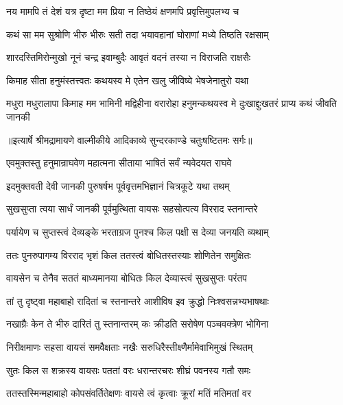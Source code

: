 \twolineshloka
{नय मामपि तं देशं यत्र दृष्टा मम प्रिया}
{न तिष्ठेयं क्षणमपि प्रवृत्तिमुपलभ्य च} %

\twolineshloka
{कथं सा मम सुश्रोणि भीरु भीरुः सती तदा}
{भयावहानां घोराणां मध्ये तिष्ठति रक्षसाम्} %

\twolineshloka
{शारदस्तिमिरोन्मुखो नूनं चन्द्र इवाम्बुदैः}
{आवृतं वदनं तस्या न विराजति राक्षसैः} %

\twolineshloka
{किमाह सीता हनुमंस्तत्त्वतः कथयस्व मे}
{एतेन खलु जीविष्ये भेषजेनातुरो यथा} %

\threelineshloka
{मधुरा मधुरालापा किमाह मम भामिनी}
{मद्विहीना वरारोहा हनुमन्कथयस्व मे}
{दुःखाद्दुःखतरं प्राप्य कथं जीवति जानकी} %


{॥इत्यार्षे श्रीमद्रामायणे वाल्मीकीये आदिकाव्ये सुन्दरकाण्डे चतुःषष्टितमः सर्गः॥}


\twolineshloka
{एवमुक्तस्तु हनुमान्राघवेण महात्मना}
{सीताया भाषितं सर्वं न्यवेदयत राघवे} %

\twolineshloka
{इदमुक्तवती देवी जानकी पुरुषर्षभ}
{पूर्ववृत्तमभिज्ञानं चित्रकूटे यथा तथम्} %

\twolineshloka
{सुखसुप्ता त्वया सार्धं जानकी पूर्वमुत्थिता}
{वायसः सहसोत्पत्य विरराद स्तनान्तरे} %

\twolineshloka
{पर्यायेण च सुप्तस्त्वं देव्यङ्के भरताग्रज}
{पुनश्च किल पक्षी स देव्या जनयति व्यथाम्} %

\twolineshloka
{ततः पुनरुपागम्य विरराद भृशं किल}
{ततस्त्वं बोधितस्तस्याः शोणितेन समुक्षितः} %

\twolineshloka
{वायसेन च तेनैव सततं बाध्यमानया}
{बोधितः किल देव्यास्त्वं सुखसुप्तः परंतप} %

\twolineshloka
{तां तु दृष्ट्वा महाबाहो रादितां च स्तनान्तरे}
{आशीविष इव क्रुद्धो निःश्वसन्नभ्यभाषथाः} %

\twolineshloka
{नखाग्रैः केन ते भीरु दारितं तु स्तनान्तरम्}
{कः क्रीडति सरोषेण पञ्चवक्त्रेण भोगिना} %

\twolineshloka
{निरीक्षमाणः सहसा वायसं समवैक्षताः}
{नखैः सरुधिरैस्तीक्ष्णैर्मामेवाभिमुखं स्थितम्} %

\twolineshloka
{सुतः किल स शक्रस्य वायसः पततां वरः}
{धरान्तरचरः शीघ्रं पवनस्य गतौ समः} %

\twolineshloka
{ततस्तस्मिन्महाबाहो कोपसंवर्तितेक्षणः}
{वायसे त्वं कृत्वाः क्रूरां मतिं मतिमतां वर} %

